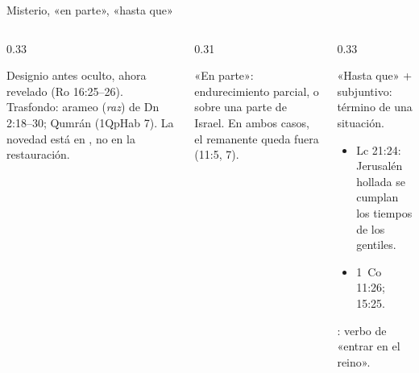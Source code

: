 \begin{frame}{Misterio, «en parte», «hasta que»}
\begin{columns}[T,onlytextwidth]
\begin{column}{0.33\textwidth}\small\RaggedRight
\textbf{\textcolor{ladrillo}{}}\par\smallskip
Designio antes oculto, ahora revelado (Ro 16:25--26). Trasfondo: arameo  (\emph{raz}) de Dn 2:18--30; Qumrán (1QpHab 7). La novedad está en , no en la restauración.
\end{column}
\begin{column}{0.31\textwidth}\small\RaggedRight
\textbf{\textcolor{ladrillo}{}}\par\smallskip
«En parte»: endurecimiento parcial, o sobre una parte de Israel. En ambos casos, el remanente queda fuera (11:5, 7).
\end{column}
\begin{column}{0.33\textwidth}\small\RaggedRight
\textbf{\textcolor{ladrillo}{}}\par\smallskip
«Hasta que» + subjuntivo: término de una situación.
\begin{itemize}
\item Lc 21:24: Jerusalén hollada  se cumplan los tiempos de los gentiles.
\item 1~Co 11:26; 15:25.
\end{itemize}
: verbo de «entrar en el reino».
\end{column}
\end{columns}\vspace{4pt}
\centering
{}\elabpropia
\end{frame}

